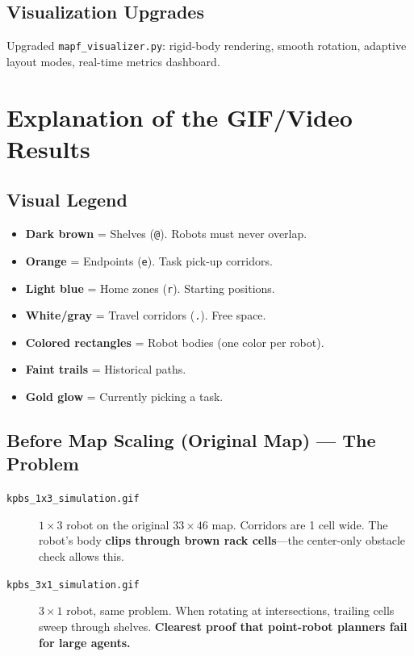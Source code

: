\documentclass[12pt, a4paper]{article}
\begin{document}
\subsection{Visualization Upgrades}
Upgraded \texttt{mapf\_visualizer.py}: rigid-body rendering, smooth rotation, adaptive layout modes, real-time metrics dashboard.

\section{Explanation of the GIF/Video Results}
\label{sec:gifs}

\subsection{Visual Legend}
\begin{itemize}
    \item \textbf{Dark brown} = Shelves (\texttt{@}). Robots must never overlap.
    \item \textbf{Orange} = Endpoints (\texttt{e}). Task pick-up corridors.
    \item \textbf{Light blue} = Home zones (\texttt{r}). Starting positions.
    \item \textbf{White/gray} = Travel corridors (\texttt{.}). Free space.
    \item \textbf{Colored rectangles} = Robot bodies (one color per robot).
    \item \textbf{Faint trails} = Historical paths.
    \item \textbf{Gold glow} = Currently picking a task.
\end{itemize}

\subsection{Before Map Scaling (Original Map) --- The Problem}

\begin{description}
    \item[\texttt{kpbs\_1x3\_simulation.gif}] $1\times3$ robot on the original $33\times46$ map. Corridors are 1 cell wide. The robot's body \textbf{clips through brown rack cells}---the center-only obstacle check allows this.

    \item[\texttt{kpbs\_3x1\_simulation.gif}] $3\times1$ robot, same problem. When rotating at intersections, trailing cells sweep through shelves. \textbf{Clearest proof that point-robot planners fail for large agents.}
\end{description}
\end{document}
